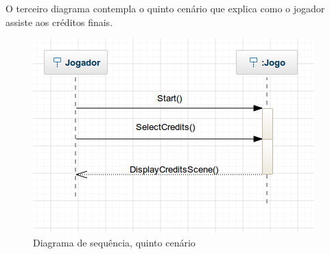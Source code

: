 O terceiro diagrama contempla o quinto cenário que explica como o jogador assiste aos créditos finais.

\begin{figure}[H]
\centering\includegraphics[scale=0.7]{figuras/SequenceDiagram3.png}
\caption{Diagrama de sequência, quinto cenário}
\end{figure}
